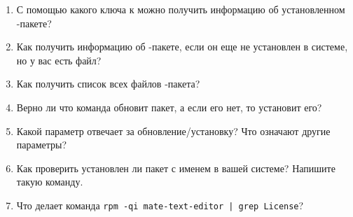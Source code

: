 \begin{enumerate}
	\item С помощью какого ключа к  можно получить информацию об установленном -пакете?
	\item Как получить информацию об -пакете, если он еще не установлен в системе, но у вас есть файл?
	\item Как получить список всех файлов -пакета?
	\item Верно ли что команда  обновит пакет, а если его нет, то установит его?
	\item	Какой параметр отвечает за обновление/установку? Что означают другие параметры?
	\item Как проверить установлен ли пакет с именем  в вашей системе? Напишите такую команду.
	\item Что делает команда \verb!rpm -qi mate-text-editor | grep License!?
\end{enumerate}
